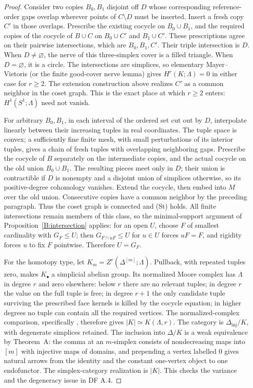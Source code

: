 \begin{proof}
Consider two copies $B_0,B_1$ disjoint off $D$ whose corresponding
reference-order gaps overlap wherever points of $C\setminus D$
must be inserted. Insert a fresh copy $C'$ in those overlaps.
Prescribe the existing cocycle on $B_0\cup B_1$, and the required
copies of the cocycle of $B\cup C$ on $B_0\cup C'$ and
$B_1\cup C'$. These prescriptions agree on their pairwise
intersections, which are $B_0,B_1,C'$. Their triple intersection
is $D$. When $D\ne\varnothing$, the nerve of this three-simplex
cover is a filled triangle. When $D=\varnothing$, it is a circle.
The intersections are simplices, so elementary Mayer--Vietoris
(or the finite good-cover nerve lemma) gives
$H^r(K;\Lambda)=0$ in either case for $r\geq2$.
The extension construction above realizes $C'$ as a common
neighbor in the coset graph. This is the exact place at which
$r\geq2$ enters: $H^1(S^1;\Lambda)$ need not vanish.

For arbitrary $B_0,B_1$, in each interval of the ordered set cut
out by $D$, interpolate linearly between their increasing tuples
in real coordinates. The tuple space is convex; a sufficiently
fine finite mesh, with small perturbations of its interior
tuples, gives a chain of fresh tuples with overlapping neighboring
gaps. Prescribe the cocycle of $B$ separately on the intermediate
copies, and the actual cocycle on the old union $B_0\cup B_1$.
The resulting pieces meet only in $D$; their union is contractible
if $D$ is nonempty and a disjoint union of simplices otherwise,
so its positive-degree cohomology vanishes. Extend the cocycle,
then embed into $M$ over the old union. Consecutive copies have
a common neighbor by the preceding paragraph. Thus the coset
graph is connected and (St) holds. All finite intersections
remain members of this class, so the minimal-support argument
of Proposition~\ref{B:intersection} applies: for an open $U$,
choose $F$ of smallest cardinality with $G_F\leq U$; then
$G_{F\cap uF}\leq U$ for $u\in U$ forces $uF=F$, and rigidity
forces $u$ to fix $F$ pointwise. Therefore $U=G_F$.

For the homotopy type, let
$K_m=Z^r(\Delta^{[m]};\Lambda)$. Pullback, with repeated tuples
zero, makes $K_\bullet$ a simplicial abelian group. Its normalized
Moore complex has $\Lambda$ in degree $r$ and zero elsewhere:
below $r$ there are no relevant tuples; in degree $r$ the value
on the full tuple is free; in degree $r+1$ the only candidate
tuple surviving the prescribed face kernels is killed by the
cocycle equation; in higher degrees no tuple can contain all the
required vertices. The normalized-complex comparison, specifically
\cite[Theorem III.2.4 and Corollary III.2.7]{ABGoerssJardine},
therefore gives $|K|\simeq K(\Lambda,r)$. The category is
$\Delta_{\mathrm{inj}}/K$, with degenerate simplices retained.
The inclusion into $\Delta/K$ is a weak equivalence by
Theorem~A: the comma at an $m$-simplex consists of nondecreasing
maps into $[m]$ with injective maps of domains, and prepending
a vertex labelled $0$ gives natural arrows from the identity
and the constant one-vertex object to one endofunctor.
The simplex-category realization is $|K|$. This checks the
variance and the degeneracy issue in DF A.4.


\end{proof}
